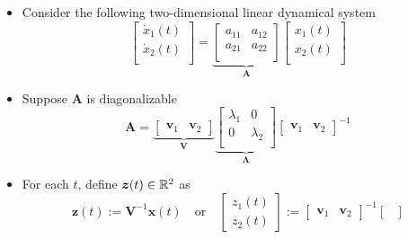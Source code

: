 \documentclass[12pt,a4paper]{article}
\begin{document}
\begin{itemize}
  \begin{itemize}
  \item Consider the following two-dimensional linear dynamical system
    \begin{equation}\label{eq:2x2}%
      \begin{bmatrix}
        \dot{x}_{1}(t)\\
        \dot{x}_{2}(t)\\
      \end{bmatrix}
      =
      \underbrace{
      \begin{bmatrix}
        a_{11} & a_{12}\\
        a_{21} & a_{22}\\
      \end{bmatrix}}_{\bm{A}}
      \begin{bmatrix}
        x_{1}(t)\\
        x_{2}(t)\\
      \end{bmatrix}
    \end{equation}
  \item Suppose $\bm{A}$ is diagonalizable
    \begin{equation}\nonumber%
      \bm{A} =
      \underbrace{
      \begin{bmatrix}
        \bm{v}_{1} & \bm{v}_{2}
      \end{bmatrix}}_{\bm{V}}
    \underbrace{
      \begin{bmatrix}
        \lambda_{1} & 0 \\
        0 & \lambda_{2} \\
      \end{bmatrix}}_{\bm{\Lambda}}
      \begin{bmatrix}
        \bm{v}_{1} & \bm{v}_{2}
      \end{bmatrix}^{-1}
    \end{equation}
  \item For each $t$, define $\bm{z}(t)\in\mathbb{R}^{2}$ as
    \begin{equation}\label{eq:zt}%
      \bm{z}(t):=\bm{V}^{-1}\bm{x}(t)
      \quad\text{or}\quad
      \begin{bmatrix}
        z_{1}(t) \\ z_{2}(t)
      \end{bmatrix}
      :=
      \begin{bmatrix}
        \bm{v}_{1} & \bm{v}_{2}
      \end{bmatrix}^{-1}
      \begin{bmatrix}

\end{bmatrix}
\end{equation}
\end{itemize}
\end{itemize}
\end{document}
